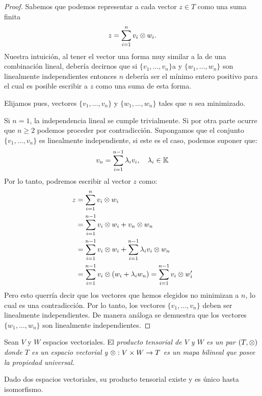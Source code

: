 \begin{proof}
	Sabemos que podemos representar a cada vector $z \in T$ como una suma finita
	\[
		z = \sum_{i=1}^{n} v_i \otimes w_i.
	\]
	Nuestra intuición, al tener el vector una forma muy similar a la de una
	combinación lineal, debería decirnos que si $\{v_1, \ldots, v_n\}$a y
	$\{w_1, \ldots, w_n\}$ son linealmente independientes entonces $n$ debería
	ser el mínimo entero positivo para el cual es posible escribir a $z$ como
	una suma de esta forma.

	Elijamos pues, vectores $\{v_1,\ldots,v_n\}$ y $\{w_1,\ldots,w_n\}$ tales que
	$n$ sea minimizado.

	Si $n=1$, la independencia lineal se cumple trivialmente. Si por otra parte
	ocurre que $n \geq 2$ podemos proceder por contradicción. Supongamos que el
	conjunto $\{v_1, \ldots, v_n\}$ es linealmente independiente, si este es el
	caso, podemos suponer que:
	\[
		v_n = \sum_{i=1}^{n-1} \lambda_i v_i, \quad \lambda_{i} \in \mathbb{K}
	\]
	Por lo tanto, podremos escribir al vector $z$ como:
	\begin{align*}
		z & = \sum_{i=1}^{n} v_i \otimes w_i                                        \\
		  & = \sum_{i=1}^{n-1} v_i \otimes w_i + v_n \otimes w_n                        \\
		  & = \sum_{i=1}^{n-1}v_i\otimes w_i +\sum_{i=1}^{n-1}\lambda_i v_i \otimes w_n \\
		  & = \sum_{i=1}^{n-1}v_i\otimes (w_i + \lambda_i w_n)
		= \sum_{i=1}^{n-1} v_i \otimes w'_i
	\end{align*}
	Pero esto querría decir que los vectores que hemos elegidos no minimizan a
	$n$, lo cual es una contradicción. Por lo tanto, los vectores $\{v_1,
		\ldots, v_n\}$ deben ser linealmente independientes.
	De manera análoga se demuestra que los vectores $\{w_1,\ldots, w_n\}$ son
	linealmente independientes.
\end{proof}

\begin{definition}
	Sean $V$ y $W$ espacios vectoriales. El \it{producto tensorial} de $V$ y $W$
	es un par $(T, \otimes)$ donde $T$ es un espacio vectorial y $\otimes: V \times W \to
		T$ es un mapa bilineal que posee la propiedad universal.
\end{definition}

\begin{theorem}
	Dado dos espacios vectoriales, su producto tensorial existe y es único hasta
	isomorfismo.
\end{theorem}

